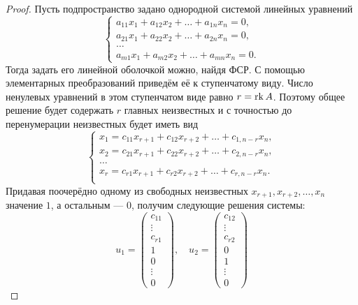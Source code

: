 \begin{proof}
    Пусть подпространство задано однородной системой линейных уравнений
    \[
        \begin{cases}
            a_{11}x_1 + a_{12}x_2 + \ldots + a_{1n}x_n = 0,\\
            a_{21}x_1 + a_{22}x_2 + \ldots + a_{2n}x_n = 0,\\
            \ldots\\
            a_{m1}x_1 + a_{m2}x_2 + \ldots + a_{mn}x_n = 0.
        \end{cases}
    \]
    Тогда задать его линейной оболочкой можно, найдя ФСР. С помощью элементарных преобразований приведём её к ступенчатому виду. Число ненулевых уравнений в этом ступенчатом виде равно $r = \operatorname{rk} A$. Поэтому общее решение будет содержать $r$ главных неизвестных и с точностью до перенумерации неизвестных будет иметь вид
    \[
        \begin{cases}
            x_1 = c_{11}x_{r + 1} + c_{12}x_{r + 2} + \ldots + c_{1, n - r}x_n,\\
            x_2 = c_{21}x_{r + 1} + c_{22}x_{r + 2} + \ldots + c_{2, n - r}x_n,\\
            \ldots\\
            x_r = c_{r1}x_{r + 1} + c_{r2}x_{r + 2} + \ldots + c_{r, n - r}x_n.\\
        \end{cases}
    \]
    Придавая поочерёдно одному из свободных неизвестных $x_{r + 1}, x_{r + 2}, \ldots, x_n$ значение $1$, а остальным --- $0$, получим следующие решения системы:
    \[
        u_1 = 
        \begin{pmatrix}
            c_{11}\\
            \vdots\\
            c_{r1}\\
            1\\
            0\\
            \vdots\\
            0
        \end{pmatrix},\quad
        u_2 = 
        \begin{pmatrix}
            c_{12}\\
            \vdots\\
            c_{r2}\\
            0\\
            1\\
            \vdots\\
            0

\end{pmatrix}\]
\end{proof}
